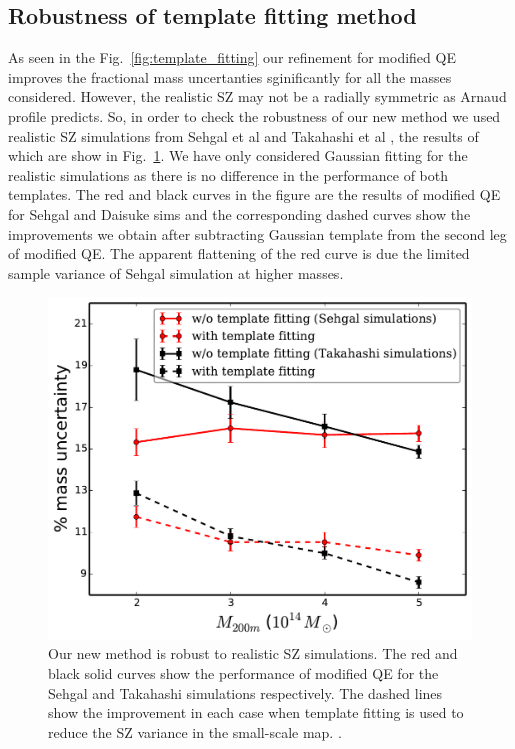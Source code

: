 \subsection{Robustness of template fitting method}
\label{subsec:simsz}
As seen in the Fig.~\ref{fig:template_fitting} our refinement for modified QE improves the fractional mass uncertanties sginificantly for all the masses considered.
 However, the realistic SZ may not be a radially symmetric as Arnaud profile predicts.
So, in order to check the robustness of our new method we used realistic SZ simulations from Sehgal et al \cite{sehgal10} and Takahashi et al \cite{takahashi17}, the results of which are show in Fig.~\ref{fig:realistic_sims}. 
We have only considered Gaussian fitting for the realistic simulations as there is no difference in the performance of both templates.  
The red and black curves in the figure are the results of modified QE for Sehgal and Daisuke sims and the corresponding dashed curves show the improvements we obtain after subtracting Gaussian template from the second leg of modified QE.
 The apparent flattening of the red curve is due the limited sample variance of Sehgal simulation at higher masses.

\begin{figure}[htb]
\includegraphics[width=\linewidth]{figs/Daisuke_Sehgal_results.pdf}
 \caption{
Our new method is robust to realistic SZ simulations. 
The red and black solid curves show the performance of modified QE for the Sehgal and Takahashi simulations respectively. 
The dashed lines show the improvement in each case when template fitting is used to reduce the SZ variance in the small-scale map. 
 .
 }
\label{fig:realistic_sims}
\end{figure}


